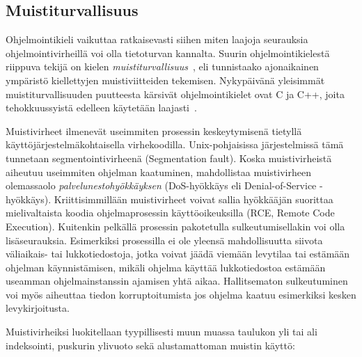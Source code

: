 \subsection{Muistiturvallisuus}
\label{Muistivirheet}

Ohjelmointikieli vaikuttaa ratkaisevasti siihen miten laajoja seurauksia ohjelmointivirheillä voi olla tietoturvan kannalta.
Suurin ohjelmointikielestä riippuva tekijä on kielen \emph{muistiturvallisuus}~\cite{SoftBound},
eli tunnistaako ajonaikainen ympäristö kiellettyjen muistiviitteiden tekemisen.
Nykypäivänä yleisimmät muistiturvallisuuden puutteesta kärsivät ohjelmointikielet ovat C ja C++,
joita tehokkuussyistä edelleen käytetään laajasti~\cite{StaticallyDetecting,SoftBound}.

Muistivirheet ilmenevät useimmiten prosessin keskeytymisenä tietyllä
käyt\-tö\-jär\-jes\-tel\-mä\-koh\-tai\-sel\-la virhekoodilla.
Unix-pohjaisissa järjestelmissä tämä tunnetaan segmentointivirheenä (Segmentation fault).
Koska muistivirheistä aiheutuu useimmiten ohjelman kaatuminen,
mahdollistaa muistivirheen olemassaolo \emph{palvelunestohyökkäyksen} (DoS-hyökkäys eli Denial-of-Service -hyökkäys).
Kriittisimmillään muistivirheet voivat sallia hyökkääjän suorittaa mielivaltaista koodia
ohjelmaprosessin käyttöoikeuksilla (RCE, Remote Code Execution).
Kuitenkin pelkällä prosessin pakotetulla sulkeutumisellakin voi olla lisäseurauksia.
Esimerkiksi prosessilla ei ole yleensä mahdollisuutta siivota väliaikais- tai lukkotiedostoja,
jotka voivat jäädä viemään levytilaa tai estämään ohjelman käyn\-nis\-tä\-mi\-sen,
mikäli ohjelma käyttää lukkotiedostoa es\-tä\-mään useamman ohjelmainstanssin ajamisen yhtä aikaa.
Hallitsematon sulkeutuminen voi myös aiheuttaa tiedon korruptoitumista jos ohjelma kaatuu esimerkiksi kesken levykirjoitusta.

Muistivirheiksi luokitellaan tyypillisesti muun muassa
taulukon yli tai ali indeksointi, puskurin ylivuoto sekä alustamattoman muistin käyttö:


